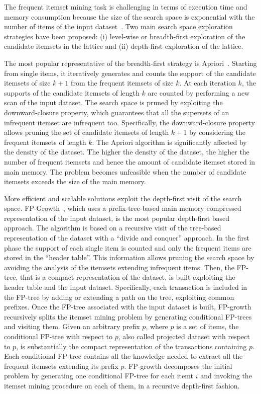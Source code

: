 The frequent itemset mining task is challenging in terms of execution time and memory consumption because the size of the search space is exponential with the number of items of the input dataset~\cite{goethals2003survey}.
Two main search space exploration strategies have been proposed: 
(i) level-wise or breadth-first exploration of the candidate itemsets in the lattice and 
(ii) depth-first exploration of the lattice.

The most popular representative of the breadth-first strategy is Apriori~\cite{Agr94}. Starting from single items, it iteratively generates and counts the support of the candidate itemsets of size $k+1$ from the frequent itemsets of size $k$. At each iteration $k$, the supports of the candidate itemsets of length $k$ are counted by performing a new scan of the input dataset.
The search space is pruned by exploiting the downward-closure property, which guarantees that all the supersets of an infrequent itemset are infrequent
too. Specifically, the downward-closure property allows pruning the set of candidate itemsets of length $k+1$ by considering the 
frequent itemsets of length $k$.
The Apriori algorithm is significantly affected by the density of the dataset.
The higher the density of the dataset, the higher the number of frequent itemsets and hence the amount of candidate 
itemset stored in main memory. The problem becomes unfeasible when the number of candidate itemsets exceeds the size of the main memory.


More efficient and scalable solutions exploit the depth-first visit of the search space. 
FP-Growth~\cite{Han00}, which uses a prefix-tree-based main memory compressed representation of the input dataset, is the most popular depth-first based approach. 
The algorithm is based on a recursive visit of the tree-based representation of the dataset with a
``divide and conquer'' approach. In the first phase the support of each single item is
counted and only the frequent items are stored in the ``header table''. This information allows pruning the search space by avoiding the analysis of the itemsets extending infrequent items. Then, the FP-tree, that is a compact representation of the dataset, is built exploiting 
the header table and the input dataset. Specifically, each transaction is included in the FP-tree by adding or
extending a path on the tree, exploiting common prefixes. 
Once the FP-tree associated with the input dataset is built, FP-growth recursively splits the itemset mining problem 
by generating conditional FP-trees and visiting them.  Given an arbitrary prefix $p$, where $p$ is a set of items, the conditional FP-tree with respect to 
$p$, also called projected dataset with respect to $p$, is substantially the compact representation of the transactions containing  $p$. Each conditional FP-tree contains all the knowledge needed to extract all the frequent itemsets extending its prefix $p$. FP-growth decomposes the initial problem by generating one conditional FP-tree for each itemt $i$ and invoking
the itemset mining procedure on each of them, in a recursive depth-first fashion. 


